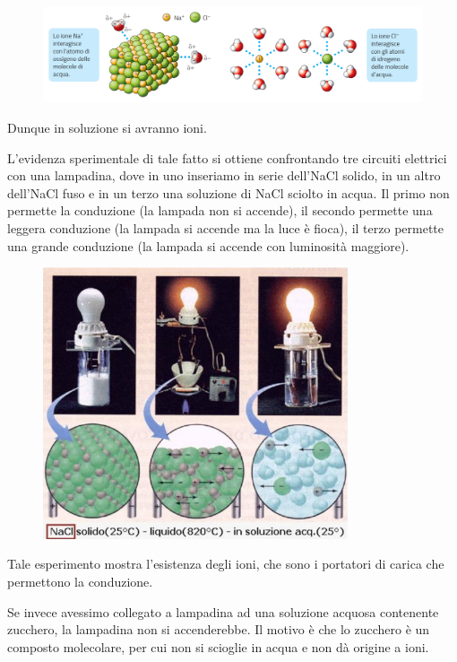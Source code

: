 \vspace{-0.3cm}\begin{figure}[htp]
    \centering
    \includegraphics[width=15cm]{immagini/interazione-acqua-ioni.png}
\end{figure}

\vspace{-0.3cm}Dunque in soluzione si avranno ioni.

L'evidenza sperimentale di tale fatto si ottiene confrontando tre circuiti elettrici con una lampadina, dove in uno inseriamo in serie dell'NaCl solido, in un altro dell'NaCl fuso e in un terzo una soluzione di NaCl sciolto in acqua. Il primo non permette la conduzione (la lampada non si accende), il secondo permette una leggera conduzione (la lampada si accende ma la luce è fioca), il terzo permette una grande conduzione (la lampada si accende con luminosità maggiore).

\begin{figure}[htp]
    \centering
    \includegraphics[width=9cm]{immagini/lampadina.png}
\end{figure}

Tale esperimento mostra l'esistenza degli ioni, che sono i portatori di carica che permettono la conduzione.

Se invece avessimo collegato a lampadina ad una soluzione acquosa contenente zucchero, la lampadina non si accenderebbe. Il motivo è che lo zucchero è un composto molecolare, per cui non si scioglie in acqua e non dà origine a ioni.
